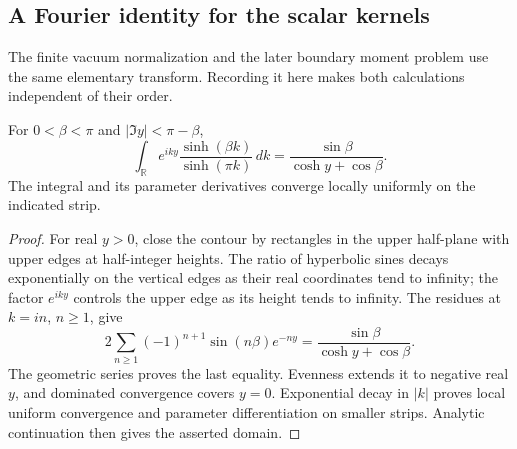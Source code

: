 \subsection{A Fourier identity for the scalar kernels}

The finite vacuum normalization and the later boundary moment problem
use the same elementary transform. Recording it here makes both
calculations independent of their order.

\begin{lemma}\label{j:fourier-kernel}
For $0<\beta<\pi$ and $|\Im y|<\pi-\beta$,
\[
 \int_{\mathbb R}e^{iky}\frac{\sinh(\beta k)}{\sinh(\pi k)}\,dk
 =\frac{\sin\beta}{\cosh y+\cos\beta}.
\]
The integral and its parameter derivatives converge locally uniformly
on the indicated strip.
\end{lemma}
\begin{proof}
For real $y>0$, close the contour by rectangles in the upper half-plane
with upper edges at half-integer heights. The ratio of hyperbolic sines
decays exponentially on the vertical edges as their real coordinates
tend to infinity; the factor $e^{iky}$ controls the upper edge as its
height tends to infinity. The residues at $k=in$, $n\ge1$, give
\[
 2\sum_{n\ge1}(-1)^{n+1}\sin(n\beta)e^{-ny}
 =\frac{\sin\beta}{\cosh y+\cos\beta}.
\]
The geometric series proves the last equality. Evenness extends it to
negative real $y$, and dominated convergence covers $y=0$.
Exponential decay in $|k|$ proves local uniform convergence and
parameter differentiation on smaller strips. Analytic continuation
then gives the asserted domain.
\end{proof}

